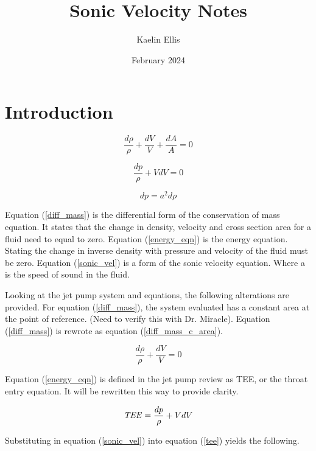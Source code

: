 \documentclass{article}
\title{Sonic Velocity Notes}
\author{Kaelin Ellis}
\date{February 2024}
\newcommand\Tee{\mbox{\textit{TEE}}}  %
\begin{document}
\maketitle

\section{Introduction}

\begin{equation}
\frac{d\rho}{\rho} + \frac{dV}{V} + \frac{dA}{A} = 0
\label{diff_mass}
\end{equation}

\begin{equation}
\frac{dp}{\rho} + VdV = 0
\label{energy_eqn}
\end{equation}

\begin{equation}
dp = a^2d\rho
\label{sonic_vel}
\end{equation}

Equation (\ref{diff_mass}) is the differential form of the conservation of mass equation. It states that the change in density, velocity and cross section area for a fluid need to equal to zero. Equation (\ref{energy_eqn}) is the energy equation. Stating the change in inverse density with pressure and velocity of the fluid must be zero. Equation (\ref{sonic_vel}) is a form of the sonic velocity equation. Where a is the speed of sound in the fluid. 

Looking at the jet pump system and equations, the following alterations are provided. For equation (\ref{diff_mass}), the system evaluated has a constant area at the point of reference. (Need to verify this with Dr. Miracle). Equation (\ref{diff_mass}) is rewrote as equation (\ref{diff_mass_c_area}).

\begin{equation}
\frac{d\rho}{\rho} + \frac{dV}{V} = 0
\label{diff_mass_c_area}
\end{equation}

Equation (\ref{energy_eqn}) is defined in the jet pump review as TEE, or the throat entry equation. It will be rewritten this way to provide clarity.

\begin{equation}
    \Tee = \frac{dp}{\rho} + VdV
\label{tee}
\end{equation}

Substituting in equation (\ref{sonic_vel}) into equation (\ref{tee}) yields the following.
\end{document}
